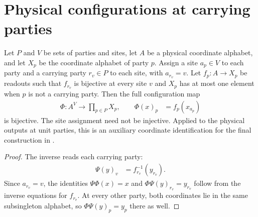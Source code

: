 \section{Physical configurations at carrying parties}

\begin{lemma}
    \label{thm:peps_physical_site_configurations}
    \leanok
    Let $P$ and $V$ be sets of parties and sites, let $A$ be a physical
    coordinate alphabet, and let $X_p$ be the coordinate alphabet of party
    $p$. Assign a site $a_p\in V$ to each party and a carrying party $r_v\in P$
    to each site, with $a_{r_v}=v$.
    Let $f_p:A\to X_p$ be readouts such that $f_{r_v}$ is bijective at every
    site $v$ and $X_p$ has at most one element when $p$ is not a carrying
    party. Then the full configuration map
    \begin{align}
        \Phi:A^V\longrightarrow\prod_{p\in P}X_p,
        \qquad \Phi(x)_p & = f_p(x_{a_p})
        \label{eq:peps_physical_configuration_map}
    \end{align}
    is bijective. The site assignment need not be injective.
    Applied to the physical outputs at unit parties, this is an auxiliary
    coordinate identification for the final construction in
    \cite[Section~8.1]{OpenAI2026PolynomialPEPS}.
\end{lemma}
\begin{proof}\leanok
    The inverse reads each carrying party:
    \begin{align}
        \Psi(y)_v & = f_{r_v}^{-1}(y_{r_v}).
        \label{eq:peps_physical_configuration_inverse}
    \end{align}
    Since $a_{r_v}=v$, the identities $\Psi\Phi(x)=x$ and
    $\Phi\Psi(y)_{r_v}=y_{r_v}$ follow from the inverse equations for
    $f_{r_v}$. At every other party, both coordinates lie in the same
    subsingleton alphabet, so $\Phi\Psi(y)_p=y_p$ there as well.
\end{proof}
